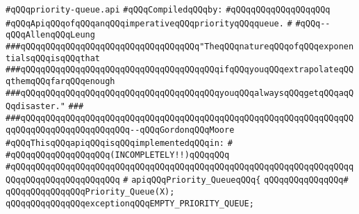 \label{src/lib/src/priority-queue.api}
\verb|#qQQqpriority-queue.api|\newline
\newline
\verb|#qQQqCompiledqQQqby:|\newline
\verb|#qQQqqQQqqQQqqQQqqQQq|\newline
\newline
\verb|#qQQqApiqQQqofqQQqanqQQqimperativeqQQqpriorityqQQqqueue.|\newline
\verb|#|\newline
\verb|#qQQq--qQQqAllenqQQqLeung|\newline
\newline
\newline
\newline
\verb|###qQQqqQQqqQQqqQQqqQQqqQQqqQQqqQQqqQQq"TheqQQqnatureqQQqofqQQqexponentialsqQQqisqQQqthat|\newline
\verb|###qQQqqQQqqQQqqQQqqQQqqQQqqQQqqQQqqQQqqQQqifqQQqyouqQQqextrapolateqQQqthemqQQqfarqQQqenough|\newline
\verb|###qQQqqQQqqQQqqQQqqQQqqQQqqQQqqQQqqQQqqQQqyouqQQqalwaysqQQqgetqQQqaqQQqdisaster."|\newline
\verb|###|\newline
\verb|###qQQqqQQqqQQqqQQqqQQqqQQqqQQqqQQqqQQqqQQqqQQqqQQqqQQqqQQqqQQqqQQqqQQqqQQqqQQqqQQqqQQqqQQqqQQq--qQQqGordonqQQqMoore|\newline
\newline
\newline
\verb|#qQQqThisqQQqapiqQQqisqQQqimplementedqQQqin:|\newline
\verb|#|\newline
\verb|#qQQqqQQqqQQqqQQqqQQq(INCOMPLETELY!!)qQQqqQQq|\newline
\verb|#qQQqqQQqqQQqqQQqqQQqqQQqqQQqqQQqqQQqqQQqqQQqqQQqqQQqqQQqqQQqqQQqqQQqqQQqqQQqqQQqqQQqqQQqqQQq|\newline
\verb|#|\newline
\verb|apiqQQqPriority_QueueqQQq{|\newline
\verb|qQQqqQQqqQQqqQQq#|\newline
\verb|qQQqqQQqqQQqqQQqPriority_Queue(X);|\newline
\newline
\verb|qQQqqQQqqQQqqQQqexceptionqQQqEMPTY_PRIORITY_QUEUE;|\newline
